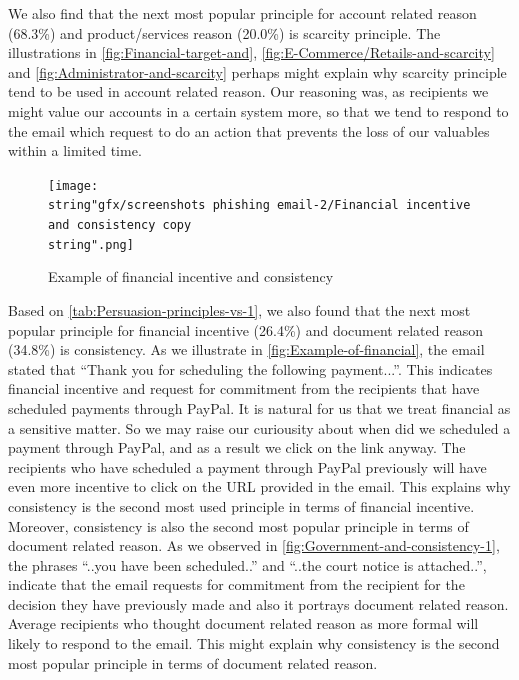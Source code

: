 We also find that the next most popular principle for account related
reason (68.3\%) and product/services reason (20.0\%) is scarcity principle.
The illustrations in \autoref{fig:Financial-target-and}, \autoref{fig:E-Commerce/Retails-and-scarcity}
and \autoref{fig:Administrator-and-scarcity} perhaps might explain
why scarcity principle tend to be used in account related reason.
Our reasoning was, as recipients we might value our accounts in a
certain system more, so that we tend to respond to the email which
request to do an action that prevents the loss of our valuables within
a limited time.

\begin{figure}[H]
\centering{}\texttt{[image: \\string"gfx/screenshots phishing email-2/Financial incentive and consistency copy\\string".png]}\protect\caption{\label{fig:Example-of-financial}Example of financial incentive and
consistency}
\end{figure}


Based on \autoref{tab:Persuasion-principles-vs-1}, we also found
that the next most popular principle for financial incentive (26.4\%)
and document related reason (34.8\%) is consistency. As we illustrate
in \autoref{fig:Example-of-financial}, the email stated that ``Thank
you for scheduling the following payment...''. This indicates financial
incentive and request for commitment from the recipients that have
scheduled payments through PayPal. It is natural for us that we treat
financial as a sensitive matter. So we may raise our curiousity about
when did we scheduled a payment through PayPal, and as a result we
click on the link anyway. The recipients who have scheduled a payment
through PayPal previously will have even more incentive to click on
the URL provided in the email. This explains why consistency is the
second most used principle in terms of financial incentive. Moreover,
consistency is also the second most popular principle in terms of
document related reason. As we observed in \autoref{fig:Government-and-consistency-1},
the phrases ``..you have been scheduled..'' and ``..the court notice
is attached..'', indicate that the email requests for commitment
from the recipient for the decision they have previously made and
also it portrays document related reason. Average recipients who thought
document related reason as more formal will likely to respond to the
email. This might explain why consistency is the second most popular
principle in terms of document related reason.

